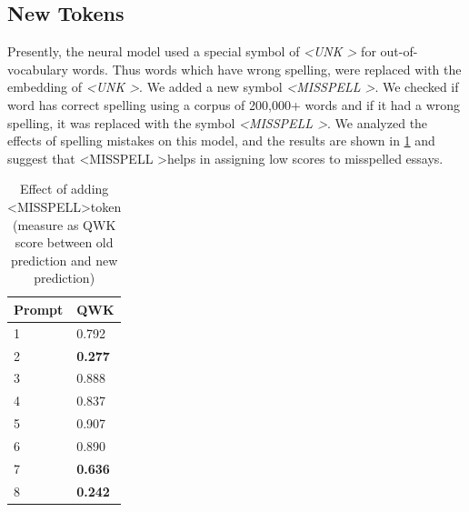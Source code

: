 \documentclass[11pt,a4paper]{article}
\begin{document}
\subsection{New Tokens}

Presently, the neural model used a special symbol of \textit{\textless UNK \textgreater} for out-of-vocabulary words. Thus words which have wrong spelling, were replaced with the embedding of \textit{\textless UNK \textgreater}. We added a new symbol \textit{\textless MISSPELL \textgreater}. We checked if word has correct spelling using a corpus of 200,000+ words and if it had a wrong spelling, it was replaced with the symbol \textit{\textless MISSPELL \textgreater}. We analyzed the effects of spelling mistakes on this model, and the results are shown in \cref{misp_diff} and suggest that \textless MISSPELL \textgreater helps in assigning low scores to misspelled essays.

\begin{table}[]
  \centering
  \begin{tabular}{|l|l|}
  \hline
  \textbf{Prompt} & \textbf{QWK} \\ \hline
  1 & 0.792 \\ \hline
  2 & \textbf{0.277} \\ \hline
  3 & 0.888 \\ \hline
  4 & 0.837 \\ \hline
  5 & 0.907 \\ \hline
  6 & 0.890 \\ \hline
  7 & \textbf{0.636} \\ \hline
  8 & \textbf{0.242} \\ \hline
  \end{tabular}
  \caption{Effect of adding \textless MISSPELL\textgreater token (measure as QWK score between old prediction and new prediction)}
  \label{misp_diff}
\end{table}

  
\end{document}
